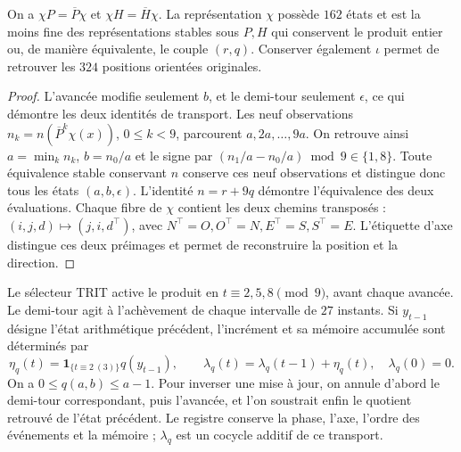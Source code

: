 \begin{proposition}
\label{ii:prd-arit:minimal}
On a \(\chi P=\overline P\chi\) et
\(\chi H=\overline H\chi\). La représentation \(\chi\)
possède \(162\) états et est la moins fine des représentations
stables sous \(P,H\) qui conservent le produit entier ou,
de manière équivalente, le couple \((r,q)\). Conserver également \(\iota\)
permet de retrouver les \(324\) positions orientées originales.
\end{proposition}
\begin{proof}
L'avancée modifie seulement \(b\), et le demi-tour seulement
\(\epsilon\), ce qui démontre les deux identités de transport.
Les neuf observations \(n_k=n(\overline P^k\chi(x))\),
\(0\leq k<9\), parcourent \(a,2a,\ldots,9a\). On retrouve ainsi
\(a=\min_k n_k\), \(b=n_0/a\) et le signe par
\((n_1/a-n_0/a)\bmod9\in\{1,8\}\). Toute équivalence stable
conservant \(n\) conserve ces neuf observations et distingue donc
tous les états \((a,b,\epsilon)\).
L'identité \(n=r+9q\) démontre l'équivalence des deux
évaluations. Chaque fibre de \(\chi\) contient les deux chemins
transposés : \((i,j,d)\mapsto(j,i,d^\top)\), avec
\(N^\top=O,O^\top=N,E^\top=S,S^\top=E\). L'étiquette d'axe distingue
ces deux préimages et permet de reconstruire la position et la direction.
\end{proof}

Le sélecteur TRIT active le produit en \(t\equiv2,5,8\pmod9\),
avant chaque avancée. Le demi-tour agit à l'achèvement de chaque
intervalle de \(27\) instants. Si \(y_{t-1}\) désigne l'état arithmétique
précédent, l'incrément et sa mémoire accumulée sont déterminés par
\begin{equation}
 \eta_q(t)=\mathbf1_{\{t\equiv2\ (3)\}}q(y_{t-1}),\qquad
 \lambda_q(t)=\lambda_q(t-1)+\eta_q(t),\quad \lambda_q(0)=0.
 \label{ii:prd-arit:incremento}
\end{equation}
On a \(0\leq q(a,b)\leq a-1\). Pour inverser une
mise à jour, on annule d'abord le demi-tour correspondant,
puis l'avancée, et l'on soustrait enfin le quotient retrouvé de
l'état précédent. Le registre conserve la phase, l'axe, l'ordre des événements et
la mémoire ; \(\lambda_q\) est un cocycle additif de ce transport.

